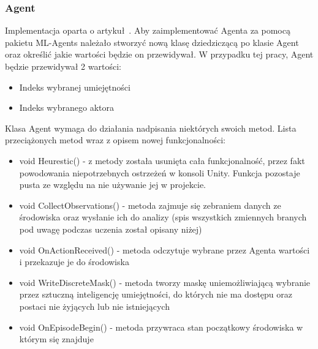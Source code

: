 \documentclass{SGGW-thesis}
\begin{document}
\subsubsection{Agent}
Implementacja oparta o artykuł~\cite{MLAgentsStartegyGuide}. Aby zaimplementować Agenta za pomocą pakietu ML-Agents należało stworzyć nową klasę dziedziczącą po klasie Agent oraz określić jakie wartości będzie on przewidywał. 
W przypadku tej pracy, Agent będzie przewidywał 2 wartości: 
\begin{itemize}
  \item{Indeks wybranej umiejętności}
  \item{Indeks wybranego aktora}
\end{itemize}
Klasa Agent wymaga do działania nadpisania niektórych swoich metod. Lista przeciążonych metod wraz z opisem nowej funkcjonalności:
\begin{itemize}
  \item{void Heurestic() - z metody została usunięta cała funkcjonalność, przez fakt powodowania niepotrzebnych ostrzeżeń w konsoli Unity. Funkcja pozostaje pusta ze względu na nie używanie jej w projekcie.}
  \item{void CollectObservations() - metoda zajmuje się zebraniem danych ze środowiska oraz wysłanie ich do analizy (spis wszystkich zmiennych branych pod uwagę podczas uczenia został opisany niżej)}
  \item{void OnActionReceived() - metoda odczytuje wybrane przez Agenta wartości i przekazuje je do środowiska}
  \item{void WriteDiscreteMask() - metoda tworzy maskę uniemożliwiającą wybranie przez sztuczną inteligencję umiejętności, do których nie ma dostępu oraz postaci nie żyjących lub nie istniejących}
  \item{void OnEpisodeBegin() - metoda przywraca stan początkowy środowiska w którym się znajduje}
\end{itemize}
\end{document}
